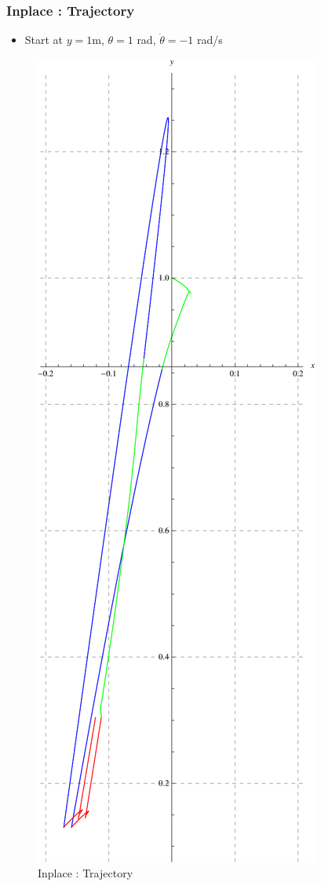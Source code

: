 \begin{frame}
\frametitle{Inplace : Trajectory}
\begin{itemize}
 \item
  Start at $y = 1$m, $\theta = 1$ rad, $\dot{\theta} = -1$ rad/s
\end{itemize}
  \begin{figure}
  \centering
  \includegraphics[scale=0.2]{fig/plot_inplace.pdf}
  \caption{Inplace : Trajectory}
  \end{figure} 
\end{frame}

